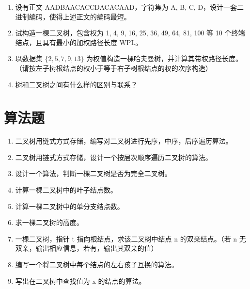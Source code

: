 \documentclass[12pt, a4paper]{article}
\begin{document}
\begin{enumerate}
	\item 设有正文 AADBAACACCDACACAAD，字符集为 A, B, C, D，设计一套二进制编码，使得上述正文的编码最短。

	\item 试构造一棵二叉树，包含权为 1, 4, 9, 16, 25, 36, 49, 64, 81, 100 等 10 个终端结点，且具有最小的加权路径长度 WPL。

	\item 以数据集 $\{2, 5, 7, 9, 13\}$ 为权值构造一棵哈夫曼树，并计算其带权路径长度。（请按左子树根结点的权小于等于右子树根结点的权的次序构造）

	\item 树和二叉树之间有什么样的区别与联系？
\end{enumerate}

\section*{算法题}

\begin{enumerate}
	\item 二叉树用链式方式存储，编写对二叉树进行先序，中序，后序遍历算法。
	\item 二叉树用链式方式存储，设计一个按层次顺序遍历二叉树的算法。
	\item 设计一个算法，判断一棵二叉树是否为完全二叉树。
	\item 计算一棵二叉树中的叶子结点数。
	\item 计算一棵二叉树中的单分支结点数。
	\item 求一棵二叉树的高度。
	\item 一棵二叉树，指针 t 指向根结点，求该二叉树中结点 n 的双亲结点。（若 n 无双亲，输出相应信息，若有，输出其双亲的值）
	\item 编写一个将二叉树中每个结点的左右孩子互换的算法。
	\item 写出在二叉树中查找值为 x 的结点的算法。
\end{enumerate}
\end{document}
